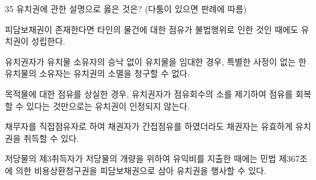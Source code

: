 \begin{question}{35}
유치권에 관한 설명으로 옳은 것은? (다툼이 있으면 판례에 따름)
\begin{choices}
  \item 피담보채권이 존재한다면 타인의 물건에 대한 점유가 불법행위로 인한 것인 때에도 유치권이 성립한다.
  \item 유치권자가 유치물 소유자의 승낙 없이 유치물을 임대한 경우, 특별한 사정이 없는 한 유치물의 소유자는 유치권의 소멸을 청구할 수 없다.
  \item 목적물에 대한 점유를 상실한 경우, 유치권자가 점유회수의 소를 제기하여 점유를 회복할 수 있다는 것만으로는 유치권이 인정되지 않는다.
  \item 채무자를 직접점유자로 하여 채권자가 간접점유를 하였더라도 채권자는 유효하게 유치권을 취득할 수 있다.
  \item 저당물의 제3취득자가 저당물의 개량을 위하여 유익비를 지출한 때에는 민법 제367조에 의한 비용상환청구권을 피담보채권으로 삼아 유치권을 행사할 수 있다.
\end{choices}
\end{question}
